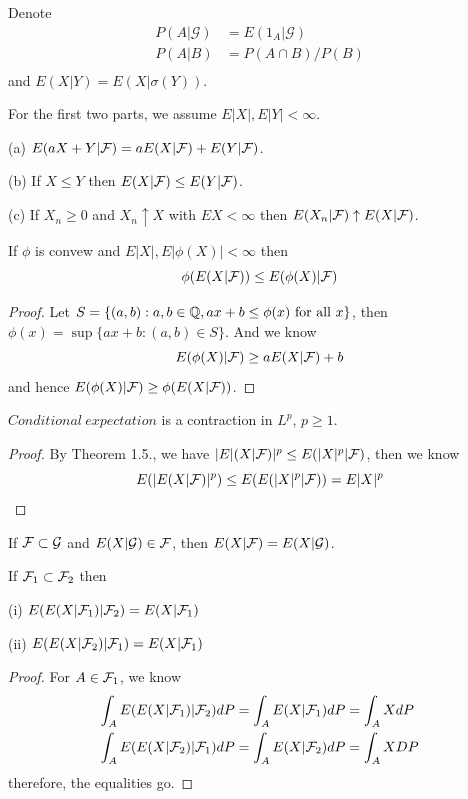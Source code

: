 \begin{definition}
Denote
\[
\begin{aligned}
P(A|\mathcal{G}) &= E(1_A|\mathcal{G}) \\
P(A|B) &= P(A\cap B)/P(B) \\
\end{aligned}
\]
and $E(X|Y) = E(X|\sigma(Y))$.
\end{definition}

\begin{theorem}
    For the first two parts, we assume $E|X|, E|Y|<\infty$.\par
    (a) $E(aX+Y|\mathcal{F}) = aE(X|\mathcal{F})+E(Y|\mathcal{F})$.\par
    (b) If $X\leq Y$ then $E(X|\mathcal{F}) \leq E(Y|\mathcal{F})$.\par
    (c) If $X_n \geq 0$ and $X_n\uparrow X$ with $EX<\infty$ then $E(X_n|\mathcal{F})\uparrow E(X|\mathcal{F})$.
\end{theorem}

\begin{theorem}
    If $\phi$ is convew and $E|X|,E|\phi(X)|< \infty$ then
    \[\phi(E(X|\mathcal{F})) \leq E(\phi(X)|\mathcal{F})\]
\end{theorem}
\begin{proof}\par
Let $S=\{(a,b):a,b\in\mathbb{Q}, ax+b \leq \phi(x)\text{ for all }x\}$, then $\phi(x) = \sup\{ax+b:(a,b)\in S\}$. And we know
\[E(\phi(X)|\mathcal{F})\geq aE(X|\mathcal{F})+b\]
and hence $E(\phi(X)|\mathcal{F}) \geq \phi(E(X|\mathcal{F}))$.\par
\end{proof}

\begin{theorem}
    $Conditional\ expectation$ is a contraction in $L^p$, $p\geq 1$.\par
\end{theorem}
\begin{proof}\par
By Theorem 1.5., we have $|E|(X|\mathcal{F})|^p \leq E(|X|^p|\mathcal{F})$, then we know 
\[E(|E(X|\mathcal{F})|^p) \leq E(E(|X|^p|\mathcal{F})) = E|X|^p\]
\end{proof}

\begin{theorem}
    If $\mathcal{F}\subset\mathcal{G}$ and $E(X|\mathcal{G}) \in \mathcal{F}$, then $E(X|\mathcal{F}) = E(X|\mathcal{G})$. 
\end{theorem}

\begin{theorem}
    If $\mathcal{F}_1\subset\mathcal{F}_2$ then\par
    (i) $E(E(X|\mathcal{F}_1)|\mathcal{F}_2) = E(X|\mathcal{F}_1)$\par
    (ii) $E(E(X|\mathcal{F}_2)|\mathcal{F}_1) = E(X|\mathcal{F}_1)$\par
\end{theorem}
\begin{proof}\par
    For $A\in \mathcal{F}_1$, we know
    \[
    \begin{aligned}
    \int_A E(E(X|\mathcal{F}_1)|\mathcal{F}_2) dP &= \int_A E(X|\mathcal{F}_1) dP = \int_A X dP \\ 
    \int_A E(E(X|\mathcal{F}_2)|\mathcal{F}_1) dP &= \int_A E(X|\mathcal{F}_2) dP = \int_A X DP
    \end{aligned}
    \]
    therefore, the equalities go.
\end{proof}

